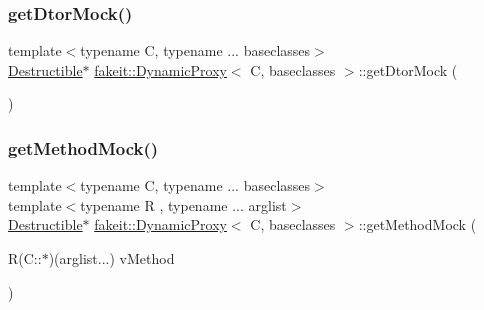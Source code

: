\subsubsection{\texorpdfstring{getDtorMock()}{getDtorMock()}\hspace{0.1cm}{\footnotesize\ttfamily [9/9]}}
{\footnotesize\ttfamily template$<$typename C, typename ... baseclasses$>$ \\
\mbox{\hyperlink{classfakeit_1_1Destructible}{Destructible}}$\ast$ \mbox{\hyperlink{structfakeit_1_1DynamicProxy}{fakeit\+::\+Dynamic\+Proxy}}$<$ C, baseclasses $>$\+::get\+Dtor\+Mock (\begin{DoxyParamCaption}{ }\end{DoxyParamCaption})\hspace{0.3cm}{\ttfamily [inline]}}

\mbox{\label{structfakeit_1_1DynamicProxy_a9774578f92b4d0258c72192dd16d6d0e}} 
\subsubsection{\texorpdfstring{getMethodMock()}{getMethodMock()}\hspace{0.1cm}{\footnotesize\ttfamily [1/9]}}
{\footnotesize\ttfamily template$<$typename C, typename ... baseclasses$>$ \\
template$<$typename R , typename ... arglist$>$ \\
\mbox{\hyperlink{classfakeit_1_1Destructible}{Destructible}}$\ast$ \mbox{\hyperlink{structfakeit_1_1DynamicProxy}{fakeit\+::\+Dynamic\+Proxy}}$<$ C, baseclasses $>$\+::get\+Method\+Mock (\begin{DoxyParamCaption}\item[{R(C\+::$\ast$)(arglist...)}]{v\+Method }\end{DoxyParamCaption})\hspace{0.3cm}{\ttfamily [inline]}}

\mbox{\label{structfakeit_1_1DynamicProxy_a9774578f92b4d0258c72192dd16d6d0e}} 
